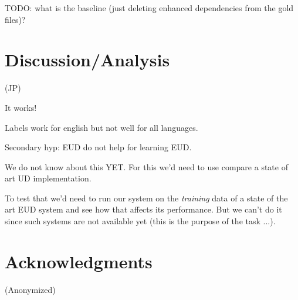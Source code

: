 \documentclass[11pt,a4paper]{article}
\begin{document}
TODO: what is the baseline (just deleting enhanced dependencies from the gold files)?

\section{Discussion/Analysis}
(JP)

It works!

Labels work for english but not well for all languages.

Secondary hyp: EUD do not help for learning EUD.

We do not know about this YET. For this we'd need to use compare a
state of art UD implementation.


To test that we'd need to run our system on the \emph{training} data
of a state of the art EUD system and see how that affects its
performance. But we can't do it since such systems are not available
yet (this is the purpose of the task ...).



\section*{Acknowledgments}

(Anonymized)



\end{document}
